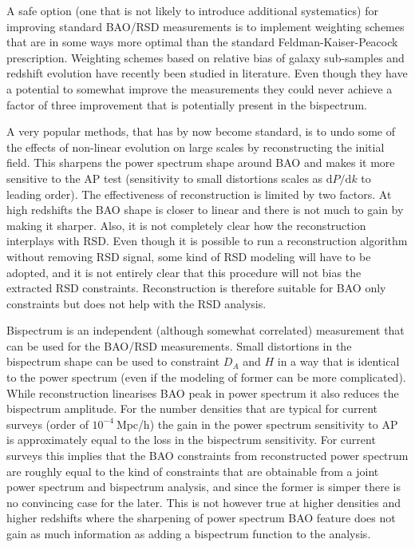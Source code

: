 A safe option (one that is not likely to introduce additional systematics) for
improving standard BAO/RSD measurements is to implement weighting schemes that
are in some ways more optimal than the standard Feldman-Kaiser-Peacock
prescription. Weighting schemes based on relative bias of galaxy sub-samples
and redshift evolution have recently been studied in literature. Even though
they have a potential to somewhat improve the measurements they could never
achieve a factor of three improvement that is potentially present in the
bispectrum.

A very popular methods, that has by now become standard, is to undo some of the
effects of non-linear evolution on large scales by reconstructing the initial
field. This sharpens the power spectrum shape around BAO and makes it more
sensitive to the AP test (sensitivity to small distortions scales as
$\mathrm{d}P/\mathrm{d}k$ to leading order). The effectiveness of
reconstruction is limited by two factors. At high redshifts the BAO shape is
closer to linear and there is not much to gain by making it sharper. Also, it
is not completely clear how the reconstruction interplays with RSD. Even though
it is possible to run a reconstruction algorithm without removing RSD signal,
some kind of RSD modeling will have to be adopted, and it is not entirely clear
that this procedure will not bias the extracted RSD constraints. Reconstruction
is therefore suitable for BAO only constraints but does not help with the RSD
analysis.

Bispectrum is an independent (although somewhat correlated) measurement that
can be used for the BAO/RSD measurements. Small distortions in the
bispectrum shape can be used to constraint $D_A$ and $H$ in a way that is
identical to the power spectrum (even if the modeling of former can be more
complicated). While reconstruction linearises BAO peak in power spectrum it
also reduces the bispectrum amplitude. For the number densities that are
typical for current surveys (order of $10^{-4}\ \mathrm{Mpc}$/h) the gain in
the power spectrum sensitivity to AP is approximately equal to the loss in the
bispectrum sensitivity. For current surveys this implies that the BAO
constraints from reconstructed power spectrum are roughly equal to the kind of
constraints that are obtainable from a joint power spectrum and bispectrum
analysis, and since the former is simper there is no convincing case for the
later. This is not however true at higher densities and higher redshifts where
the sharpening of power spectrum BAO feature does not gain as much information
as adding a bispectrum function to the analysis. 


